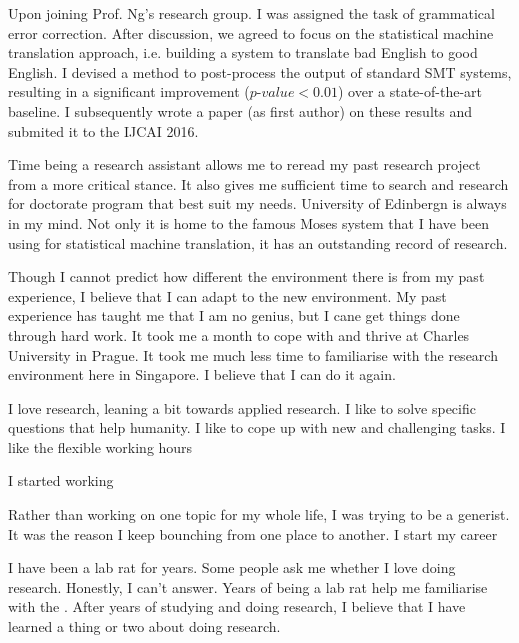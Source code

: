 \documentclass[a4paper, 12pt]{scrartcl}
\begin{document}
Upon joining Prof. Ng's research group. I was assigned the task of grammatical error correction.
After discussion, we agreed to focus on the statistical machine translation approach, i.e. building a system to translate bad English to good English. 
I devised a method to post-process the output of standard SMT systems, resulting in a significant improvement ($p\mbox{-}value < 0.01$) over a state-of-the-art baseline. 
I subsequently wrote a paper (as first author) on these results and submited it to the IJCAI 2016.  

Time being a research assistant allows me to reread my past research project from a more critical stance. It also gives me sufficient time to search and research for doctorate program that best suit my needs.
University of Edinbergn is always in my mind. Not only it is home to the famous Moses system that I have been using for statistical machine translation, it has an outstanding record of research.

Though I cannot predict how different the environment there is from my past experience, I believe that I can adapt to the new environment. 
My past experience has taught me that I am no genius, but I cane get things done through hard work.
It took me a month to cope with and thrive at Charles University in Prague.
It took me much less time to familiarise with the research environment here in Singapore.
I believe that I can do it again. 



\newpage
I love research, leaning a bit towards applied research.
I like to solve specific questions that help humanity. 
I like to cope up with new and challenging tasks.
I like the flexible working hours
 

I started working 





Rather than working on one topic for my whole life, I was trying to be a generist. 
It was the reason I keep bounching from one place to another. I start my career 

I have been a lab rat for years. 
Some people ask me whether I love doing research. Honestly, I can't answer. 
Years of being a lab rat help me familiarise with the .
After years of studying and doing research, I believe that I have learned a thing or two about doing research. 
\end{document}
